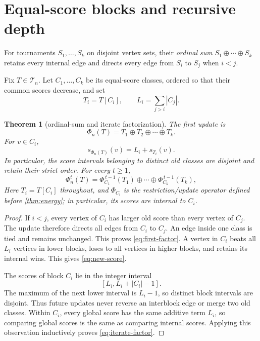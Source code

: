 \documentclass[11pt,a4paper]{amsart}
\newtheorem{theorem}{Theorem}[section]
\theoremstyle{definition}
\theoremstyle{remark}
\newcommand{\Tourn}{\mathcal T}
\begin{document}
\section{Equal-score blocks and recursive depth}\label{sec:blocks}

For tournaments $S_1,\ldots,S_k$ on disjoint vertex sets, their
\emph{ordinal sum} $S_1\oplus\cdots\oplus S_k$ retains every internal edge
and directs every edge from $S_i$ to $S_j$ when $i<j$.

Fix $T\in\Tourn_n$.  Let $C_1,\ldots,C_k$ be its equal-score classes,
ordered so that their common scores decrease, and set
\[
 T_i=T[C_i],\qquad L_i=\sum_{j>i}|C_j|.
\]

\begin{theorem}[ordinal-sum and iterate factorization]\label{thm:factor}
The first update is
\begin{equation}\label{eq:first-factor}
       \Phi_n(T)=T_1\oplus T_2\oplus\cdots\oplus T_k.
\end{equation}
For $v\in C_i$,
\begin{equation}\label{eq:new-score}
       s_{\Phi_n(T)}(v)=L_i+s_{T_i}(v).
\end{equation}
In particular, the score intervals belonging to distinct old classes are
disjoint and retain their strict order.  For every $t\geq1$,
\begin{equation}\label{eq:iterate-factor}
 \boxed{\displaystyle
 \Phi_n^t(T)=
 \Phi_{C_1}^{\,t-1}(T_1)\oplus\cdots\oplus
 \Phi_{C_k}^{\,t-1}(T_k),}
\end{equation}
Here $T_i=T[C_i]$ throughout, and $\Phi_{C_i}$ is the restriction/update
operator defined before \cref{thm:energy}; in particular, its scores are
internal to $C_i$.
\end{theorem}

\begin{proof}
If $i<j$, every vertex of $C_i$ has larger old score than every vertex of
$C_j$.  The update therefore directs all edges from $C_i$ to $C_j$.  An
edge inside one class is tied and remains unchanged.  This proves
\eqref{eq:first-factor}.  A vertex in $C_i$ beats all $L_i$ vertices in
lower blocks, loses to all vertices in higher blocks, and retains its
internal wins.  This gives \eqref{eq:new-score}.

The scores of block $C_i$ lie in the integer interval
\[
             [L_i,L_i+|C_i|-1].
\]
The maximum of the next lower interval is $L_i-1$, so distinct block
intervals are disjoint.  Thus future updates never reverse an interblock
edge or merge two old classes.  Within $C_i$, every global score has the
same additive term $L_i$, so comparing global scores is the same as
comparing internal scores.  Applying this observation inductively proves
\eqref{eq:iterate-factor}.
\end{proof}
\end{document}
